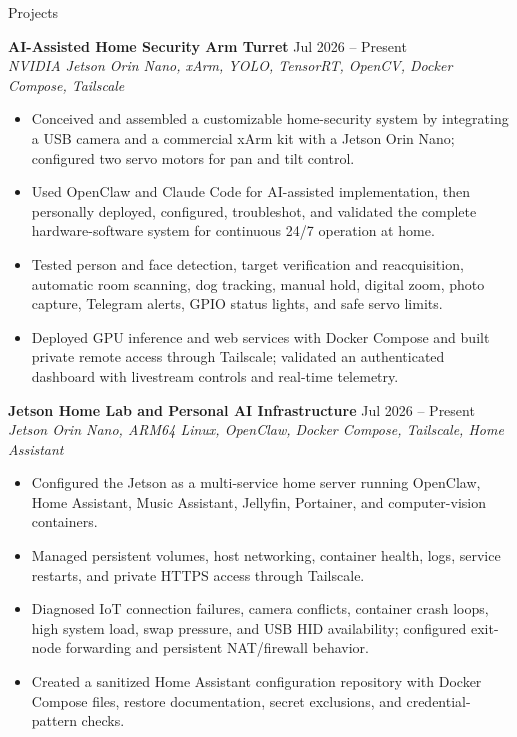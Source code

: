 \documentclass{resume}
\begin{document}
\newpage
\begin{rSection}{Projects}

\textbf{AI-Assisted Home Security Arm Turret} \hfill Jul 2026 -- Present\\
\textit{NVIDIA Jetson Orin Nano, xArm, YOLO, TensorRT, OpenCV, Docker Compose, Tailscale}
\begin{itemize}
    \itemsep -3pt {}
    \item Conceived and assembled a customizable home-security system by integrating a USB camera and a commercial xArm kit with a Jetson Orin Nano; configured two servo motors for pan and tilt control.
    \item Used OpenClaw and Claude Code for AI-assisted implementation, then personally deployed, configured, troubleshot, and validated the complete hardware-software system for continuous 24/7 operation at home.
    \item Tested person and face detection, target verification and reacquisition, automatic room scanning, dog tracking, manual hold, digital zoom, photo capture, Telegram alerts, GPIO status lights, and safe servo limits.
    \item Deployed GPU inference and web services with Docker Compose and built private remote access through Tailscale; validated an authenticated dashboard with livestream controls and real-time telemetry.
\end{itemize}

\textbf{Jetson Home Lab and Personal AI Infrastructure} \hfill Jul 2026 -- Present\\
\textit{Jetson Orin Nano, ARM64 Linux, OpenClaw, Docker Compose, Tailscale, Home Assistant}
\begin{itemize}
    \item Configured the Jetson as a multi-service home server running OpenClaw, Home Assistant, Music Assistant, Jellyfin, Portainer, and computer-vision containers.
    \item Managed persistent volumes, host networking, container health, logs, service restarts, and private HTTPS access through Tailscale.
    \item Diagnosed IoT connection failures, camera conflicts, container crash loops, high system load, swap pressure, and USB HID availability; configured exit-node forwarding and persistent NAT/firewall behavior.
    \item Created a sanitized Home Assistant configuration repository with Docker Compose files, restore documentation, secret exclusions, and credential-pattern checks.
\end{itemize}


\end{rSection}
\end{document}
